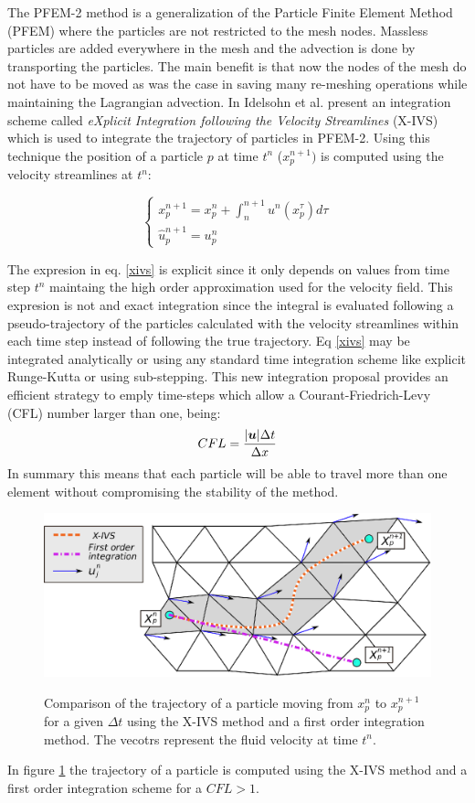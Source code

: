 The PFEM-2 method is a generalization of the Particle Finite Element Method (PFEM) \cite{sergio:pfem} where the particles are not restricted to the mesh nodes. Massless particles are added everywhere in the mesh and the advection is done by transporting the particles. The main benefit is that now the nodes of the mesh do not have to be moved as was the case in \cite{sergio:pfem} saving many re-meshing operations while maintaining the Lagrangian advection. In \cite{sergio:xivs1} Idelsohn et al. present an integration scheme called {\em eXplicit Integration following the Velocity Streamlines} (X-IVS) which is used to integrate the trajectory of particles in PFEM-2. Using this technique the position of a particle $p$ at time $t^n$ ($x_p^{n+1})$ is computed using the velocity streamlines at $t^n$:

\begin{equation}\label{xivs}
  \begin{cases}
    x_p^{n+1}=x_p^n+\int_n^{n+1} u^n(x_p^\tau) d\tau\\
    \hat{u}^{n+1}_p=u_p^n
  \end{cases}
\end{equation}

The expresion in eq. \ref{xivs} is explicit since it only depends on values from time step $t^n$ maintaing the high order approximation used for the velocity field. This expresion is not and exact integration since the integral is evaluated following a pseudo-trajectory of the particles calculated with the velocity streamlines within each time step instead of following the true trajectory. Eq \ref{xivs} may be integrated analytically or using any standard time integration scheme like explicit Runge-Kutta or using sub-stepping. This new integration proposal provides an efficient strategy to emply time-steps which allow a Courant-Friedrich-Levy (CFL) number larger than one, being:
\begin{equation}
  CFL=\frac{|\boldsymbol{u}|\Delta t}{\Delta x}
\end{equation}
In summary  this means that each particle will be able to travel more than one element without compromising the stability of the method.

\begin{figure}[htp] 
\centering 
\includegraphics[scale=.8]{./imgs/xivs.eps}
\label{fig:xivs}
\caption{Comparison of the trajectory of a particle moving from $x_p^n$ to $x_p^{n+1}$ for a given $\Delta t$ using the X-IVS method and a first order integration method. The vecotrs represent the fluid velocity at time $t^n$.}
\end{figure}

In figure \ref{fig:xivs} the trajectory of a particle is computed using the X-IVS method and a first order integration scheme for a $CFL>1$. 
